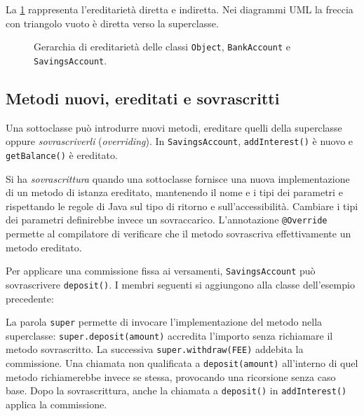 La \cref{fig:fi-java-ereditarieta-gerarchia} rappresenta
l'ereditarietà diretta e indiretta. Nei diagrammi UML la freccia
con triangolo vuoto è diretta verso la superclasse.

\begin{figure}[htbp]
  \centering
  
  \caption{Gerarchia di ereditarietà delle classi
  \texttt{Object}, \texttt{BankAccount} e \texttt{SavingsAccount}.}
  \label{fig:fi-java-ereditarieta-gerarchia}
\end{figure}

\subsection{Metodi nuovi, ereditati e sovrascritti}
\label{sec:fi-java-ereditarieta-metodi}

Una sottoclasse può introdurre nuovi metodi, ereditare quelli
della superclasse oppure \emph{sovrascriverli}
(\emph{overriding}). In \texttt{SavingsAccount},
\texttt{addInterest()} è nuovo e \texttt{getBalance()} è
ereditato.

\begin{definition}
\label{def:fi-java-ereditarieta-override}
Si ha \emph{sovrascrittura} quando una sottoclasse fornisce una
nuova implementazione di un metodo di istanza ereditato, mantenendo
il nome e i tipi dei parametri e rispettando le regole di Java
sul tipo di ritorno e sull'accessibilità. Cambiare i tipi dei
parametri definirebbe invece un sovraccarico. L'annotazione
\texttt{@Override} permette al compilatore di verificare che
il metodo sovrascriva effettivamente un metodo ereditato.
\end{definition}

\clearpage

Per applicare una commissione fissa ai versamenti,
\texttt{SavingsAccount} può sovrascrivere \texttt{deposit()}.
I membri seguenti si aggiungono alla classe dell'esempio
precedente:



La parola \texttt{super} permette di invocare l'implementazione
del metodo nella superclasse: \texttt{super.deposit(amount)}
accredita l'importo senza richiamare il metodo sovrascritto.
La successiva \texttt{super.withdraw(FEE)} addebita la commissione.
Una chiamata non qualificata a \texttt{deposit(amount)}
all'interno di quel metodo richiamerebbe invece se stessa,
provocando una ricorsione senza caso base. Dopo la sovrascrittura,
anche la chiamata a \texttt{deposit()} in \texttt{addInterest()}
applica la commissione.

